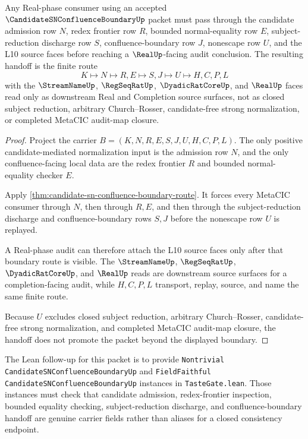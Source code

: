 \begin{theorem}
\label{thm:candidate-sn-confluence-boundary-real-phase-handoff}
Any Real-phase consumer using an accepted $\CandidateSNConfluenceBoundaryUp$ packet must pass through the candidate admission row $N$, redex frontier row $R$, bounded normal-equality row $E$, subject-reduction discharge row $S$, confluence-boundary row $J$, nonescape row $U$, and the L10 source faces before reaching a $\RealUp$-facing audit conclusion. The resulting handoff is the finite route
$$
K \longmapsto N \longmapsto R,E \longmapsto S,J \longmapsto U \longmapsto H,C,P,L
$$
with the $\StreamNameUp$, $\RegSeqRatUp$, $\DyadicRatCoreUp$, and $\RealUp$ faces read only as downstream Real and Completion source surfaces, not as closed subject reduction, arbitrary Church--Rosser, candidate-free strong normalization, or completed MetaCIC audit-map closure.
\end{theorem}
\begin{proof}
Project the carrier $B=(K,N,R,E,S,J,U,H,C,P,L)$. The only positive candidate-mediated normalization input is the admission row $N$, and the only confluence-facing local data are the redex frontier $R$ and bounded normal-equality checker $E$.

Apply \autoref{thm:candidate-sn-confluence-boundary-route}. It forces every MetaCIC consumer through $N$, then through $R,E$, and then through the subject-reduction discharge and confluence-boundary rows $S,J$ before the nonescape row $U$ is replayed.

A Real-phase audit can therefore attach the L10 source faces only after that boundary route is visible. The $\StreamNameUp$, $\RegSeqRatUp$, $\DyadicRatCoreUp$, and $\RealUp$ reads are downstream source surfaces for a completion-facing audit, while $H,C,P,L$ transport, replay, source, and name the same finite route.

Because $U$ excludes closed subject reduction, arbitrary Church--Rosser, candidate-free strong normalization, and completed MetaCIC audit-map closure, the handoff does not promote the packet beyond the displayed boundary.
\end{proof}

The Lean follow-up for this packet is to provide \texttt{Nontrivial CandidateSNConfluenceBoundaryUp} and \texttt{FieldFaithful CandidateSNConfluenceBoundaryUp} instances in \texttt{TasteGate.lean}. Those instances must check that candidate admission, redex-frontier inspection, bounded equality checking, subject-reduction discharge, and confluence-boundary handoff are genuine carrier fields rather than aliases for a closed consistency endpoint.

